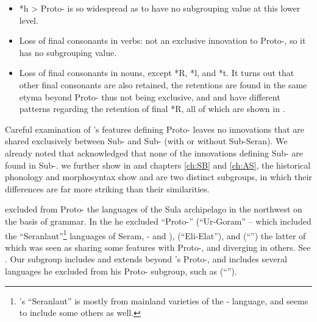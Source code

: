 \begin{itemize}
\item *h > Proto- {\0} is so widespread as to have no subgrouping
value at this lower level.

\item Loss of final consonants in verbs: not an exclusive innovation
to Proto-, so it has no subgrouping value.

\item Loss of final consonants in nouns,
except *R, *l, and *t.
It turns out that other final consonants are also retained,
the retentions are found in the same etyma beyond Proto-
thus not being exclusive,
and  and  have different patterns
regarding the retention of final *R,
all of which are shown in .
\end{itemize}

Careful examination of \citeauthor{Stresemann1927}’s features defining Proto-
leaves no innovations that are shared exclusively between
Sub- and Sub- (with or without Sub-Seran).
We already noted that \citet[7]{Stresemann1927} acknowledged
that none of the innovations defining Sub- are found in Sub-.
 we further show in 
and chapters \ref{ch:SB} and \ref{ch:AS}, the historical phonology
and morphosyntax show 
and  are two distinct subgroups,
in which their differences are far more striking than their similarities.

\citeauthor{Stresemann1927} excluded from Proto- the languages of the Sula
archipelago in the northwest on the basis of grammar.
In the  he excluded “Proto-” (“Ur-Goram” -- which included
the “Seranlaut”\footnote{
		\citeauthor{Stresemann1927}’s “Seranlaut” is mostly from
		mainland varieties of the - language,
		and seems to include some others as well.}
languages of 
Seram, - and ),  (“Eli-Elat”),
and  (“”) the latter of which was seen as sharing
some features with Proto-,
and diverging in others. See .
Our  subgroup includes
and extends beyond \citeauthor{Stresemann1927}’s Proto-,
and includes several languages he excluded from his Proto-
subgroup, such as  (“”).
